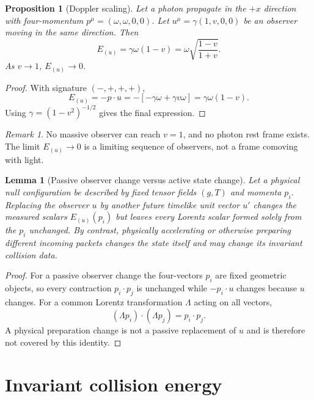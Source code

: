 \documentclass[11pt]{article}
\newtheorem{proposition}{Proposition}
\newtheorem{lemma}{Lemma}
\theoremstyle{remark}
\newtheorem{remark}{Remark}
\begin{document}
\begin{proposition}[Doppler scaling]
Let a photon propagate in the $+x$ direction with four-momentum $p^\mu=(\omega,\omega,0,0)$. Let $u^\mu=\gamma(1,v,0,0)$ be an observer moving in the same direction. Then
\begin{equation}
E_{(u)} = \gamma \omega (1-v)=\omega\sqrt{\frac{1-v}{1+v}} .
\end{equation}
As $v\to 1$, $E_{(u)}\to 0$.
\end{proposition}

\begin{proof}
With signature $(-,+,+,+)$,
\begin{equation}
E_{(u)}=-p\cdot u=-[-\gamma\omega+\gamma v\omega]=\gamma\omega(1-v).
\end{equation}
Using $\gamma=(1-v^2)^{-1/2}$ gives the final expression.
\end{proof}

\begin{remark}
No massive observer can reach $v=1$, and no photon rest frame exists. The limit $E_{(u)}\to0$ is a limiting sequence of observers, not a frame comoving with light.
\end{remark}


\begin{lemma}[Passive observer change versus active state change]
Let a physical null configuration be described by fixed tensor fields $(g,T)$ and momenta $p_i$. Replacing the observer $u$ by another future timelike unit vector $u'$ changes the measured scalars $E_{(u)}(p_i)$ but leaves every Lorentz scalar formed solely from the $p_i$ unchanged. By contrast, physically accelerating or otherwise preparing different incoming packets changes the state itself and may change its invariant collision data.
\end{lemma}

\begin{proof}
For a passive observer change the four-vectors $p_i$ are fixed geometric objects, so every contraction $p_i\cdot p_j$ is unchanged while $-p_i\cdot u$ changes because $u$ changes. For a common Lorentz transformation $\Lambda$ acting on all vectors,
\begin{equation}
 (\Lambda p_i)\cdot(\Lambda p_j)=p_i\cdot p_j.
\end{equation}
A physical preparation change is not a passive replacement of $u$ and is therefore not covered by this identity.
\end{proof}


\section{Invariant collision energy}
\end{document}
